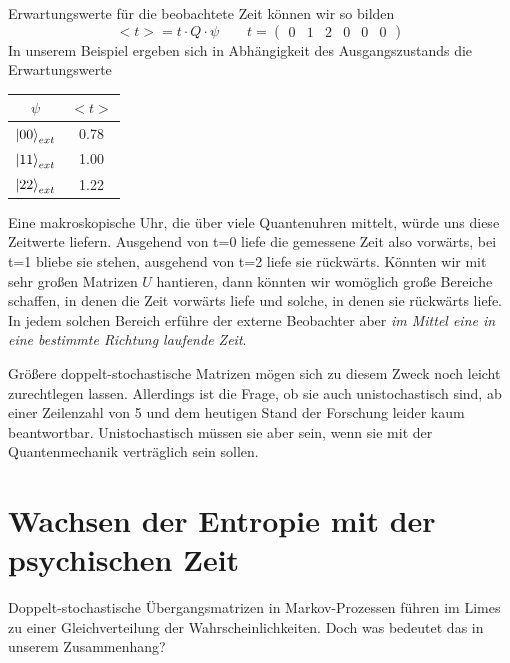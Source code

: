 \documentclass[12pt]{article}
\begin{document}
Erwartungswerte für die beobachtete Zeit können wir so bilden
\begin{equation*}
<t> = t \cdot Q \cdot \psi \quad\quad t = \begin{pmatrix}
0&1&2&0&0&0
\end{pmatrix}
\end{equation*}
In unserem Beispiel ergeben sich in Abhängigkeit des Ausgangszustands die Erwartungswerte
\begin{center}
\begin{tabular}{ |c|c| } 
 \hline
 $\psi$ & $<t>$ \\ 
 \hline
 $\ket{00}_{ext}$ & 0.78 \\ 
 $\ket{11}_{ext}$ & 1.00 \\ 
 $\ket{22}_{ext}$ & 1.22 \\
 \hline
\end{tabular}
\end{center}
Eine makroskopische Uhr, die über viele Quantenuhren mittelt, würde uns diese Zeitwerte liefern. Ausgehend von t=0 liefe die gemessene Zeit also vorwärts, bei t=1 bliebe sie stehen, ausgehend von t=2 liefe sie rückwärts. Könnten wir mit sehr großen Matrizen $U$ hantieren, dann könnten wir womöglich große Bereiche schaffen, in denen die Zeit vorwärts liefe und solche, in denen sie rückwärts liefe. In jedem solchen Bereich erführe der externe Beobachter aber \emph{im Mittel eine in eine bestimmte Richtung laufende Zeit}.

Größere doppelt-stochastische Matrizen mögen sich zu diesem Zweck noch leicht zurechtlegen lassen. Allerdings ist die Frage, ob sie auch unistochastisch sind, ab einer Zeilenzahl von 5 und dem heutigen Stand der Forschung leider kaum beantwortbar. Unistochastisch müssen sie aber sein, wenn sie mit der Quantenmechanik verträglich sein sollen.

\section{Wachsen der Entropie mit der psychischen Zeit}

Doppelt-stochastische Übergangsmatrizen in Markov-Prozessen führen im Limes zu einer Gleichverteilung der Wahrscheinlichkeiten. Doch was bedeutet das in unserem Zusammenhang?

\end{document}
